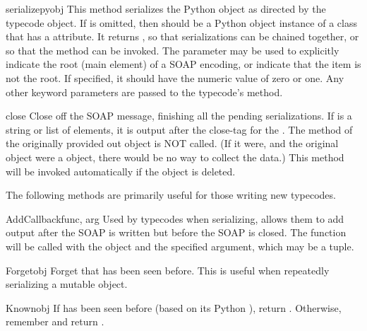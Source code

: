 \begin{methoddesc}{serialize}{pyobj}
This method serializes the  Python object as directed
by the  typecode object.
If  is omitted, then  should be a Python
object instance of a class that has a  attribute.
It returns , so that serializations can be chained together, or
so that the  method can be invoked.
The  parameter may be used to explicitly indicate the root
(main element) of a SOAP encoding, or indicate that the item is not the
root.
If specified, it should have the numeric value of zero or one.
Any other keyword parameters are passed to the typecode's 
method.
\end{methoddesc}

\begin{methoddesc}{close}{}
Close off the SOAP message, finishing all the pending serializations.
If  is a string or list of elements, it is output after the
close-tag for the .
The  method of the originally provided out object is NOT called.
(If it were, and the original  object were a 
object, there would be no way to collect the data.)
This method will be invoked automatically if the object is deleted.
\end{methoddesc}

The following methods are primarily useful for those writing new typecodes.

\begin{methoddesc}{AddCallback}{func, arg}
Used by typecodes when serializing, allows them to add output after
the SOAP  is written but before the SOAP  is closed.
The function 
will be called with the  object and the specified 
argument, which may be a tuple.
\end{methoddesc}

\begin{methoddesc}{Forget}{obj}
Forget that  has been seen before.
This is useful when repeatedly serializing a mutable object.
\end{methoddesc}

\begin{methoddesc}{Known}{obj}
If  has been seen before (based on its Python ),
return .
Otherwise, remember  and return .
\end{methoddesc}

